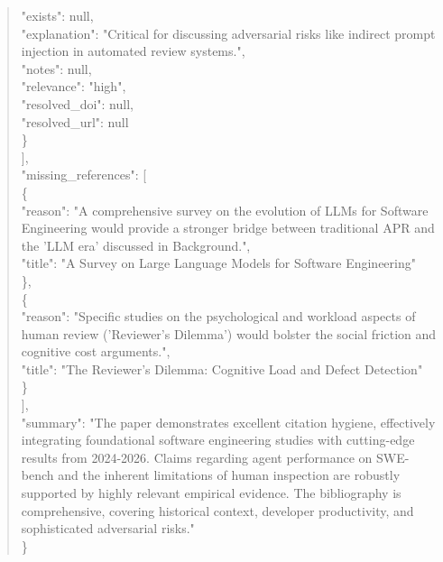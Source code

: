 \documentclass[11pt]{article}
\begin{document}
\begin{quote}
      "exists": null,\\
      "explanation": "Critical for discussing adversarial risks like indirect prompt injection in automated review systems.",\\
      "notes": null,\\
      "relevance": "high",\\
      "resolved\_doi": null,\\
      "resolved\_url": null\\
    \}\\
  ],\\
  "missing\_references": [\\
    \{\\
      "reason": "A comprehensive survey on the evolution of LLMs for Software Engineering would provide a stronger bridge between traditional APR and the 'LLM era' discussed in Background.",\\
      "title": "A Survey on Large Language Models for Software Engineering"\\
    \},\\
    \{\\
      "reason": "Specific studies on the psychological and workload aspects of human review ('Reviewer's Dilemma') would bolster the social friction and cognitive cost arguments.",\\
      "title": "The Reviewer's Dilemma: Cognitive Load and Defect Detection"\\
    \}\\
  ],\\
  "summary": "The paper demonstrates excellent citation hygiene, effectively integrating foundational software engineering studies with cutting-edge results from 2024-2026. Claims regarding agent performance on SWE-bench and the inherent limitations of human inspection are robustly supported by highly relevant empirical evidence. The bibliography is comprehensive, covering historical context, developer productivity, and sophisticated adversarial risks."\\
\}\\
\end{quote}
\end{document}
